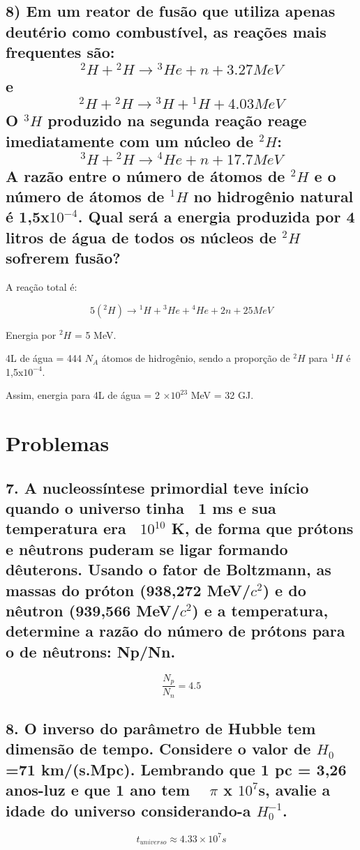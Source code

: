 \documentclass{article}
\begin{document}
\subsection*{8) Em um reator de fusão que utiliza apenas deutério como combustível, as reações mais frequentes são:
\[{}^{2}H + {}^{2}H \to {}^{3}He + n +3.27 MeV\]
e
\[{}^{2}H + {}^{2}H \to {}^{3}H + {}^{1}H +4.03 MeV\]
O ${}^{3}H$ produzido na segunda reação reage imediatamente com um núcleo de ${}^{2}H$:
\[{}^{3}H +{}^{2}H \to {}^{4}He + n + 17.7 MeV\]
A razão entre o número de átomos de ${}^{2}H$ e o número de átomos de ${}^{1}H$ no hidrogênio natural é 1,5x$10^{-4}$.
Qual será a energia produzida por 4 litros de água de todos os núcleos de ${}^{2}H$ sofrerem fusão?}

A reação total é:

\[5 ({}^{2}H) \to {}^{1}H + {}^{3}He +{}^{4}He + 2n + 25 MeV\]

Energia por ${}^{2}H$ = 5 MeV.

4L de água = 444 $N_A$ átomos de hidrogênio, sendo a proporção de ${}^{2}H$ para ${}^{1}H$ é 1,5x$10^{-4}$.

Assim, energia para 4L de água = 2 $\times 10^{23}$ MeV = 32 GJ.

\section{Problemas}

\subsection*{7. A nucleossíntese primordial teve início quando o universo tinha ~1 ms e sua temperatura era ~$10^{10}$ K, de forma que prótons e nêutrons puderam se ligar formando dêuterons. Usando o fator de Boltzmann, as massas do próton (938,272 MeV/$c^2$) e do nêutron (939,566 MeV/$c^2$) e a temperatura, determine a razão do número de prótons para o de nêutrons: Np/Nn.}

\[ \frac{N_p}{N_n} = 4.5\]

\subsection*{8. O inverso do parâmetro de Hubble tem dimensão de tempo. Considere o valor de $H_0$=71 km/(s.Mpc). Lembrando que 1 pc = 3,26 anos-luz e que 1 ano tem ~ $\pi$ x $10^7$s, avalie a idade do universo considerando-a $H_0^{-1}$.}

\[t_{universo} \approx 4.33 \times 10^7 s\]
\end{document}
